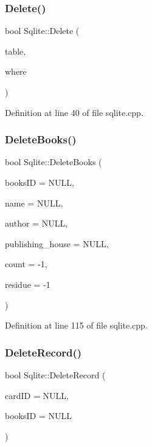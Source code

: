 \subsubsection{\texorpdfstring{Delete()}{Delete()}}
{\footnotesize\ttfamily bool Sqlite\+::\+Delete (\begin{DoxyParamCaption}\item[{Q\+String}]{table,  }\item[{Q\+String}]{where }\end{DoxyParamCaption})}



Definition at line 40 of file sqlite.\+cpp.

\mbox{\label{class_sqlite_a8a83c22e036086edf84758fb0f6cfc56}} 
\subsubsection{\texorpdfstring{DeleteBooks()}{DeleteBooks()}}
{\footnotesize\ttfamily bool Sqlite\+::\+Delete\+Books (\begin{DoxyParamCaption}\item[{Q\+String}]{books\+ID = {\ttfamily NULL},  }\item[{Q\+String}]{name = {\ttfamily NULL},  }\item[{Q\+String}]{author = {\ttfamily NULL},  }\item[{Q\+String}]{publishing\+\_\+house = {\ttfamily NULL},  }\item[{int}]{count = {\ttfamily -\/1},  }\item[{int}]{residue = {\ttfamily -\/1} }\end{DoxyParamCaption})}



Definition at line 115 of file sqlite.\+cpp.

\mbox{\label{class_sqlite_aa120de86db20f42a61a5c2eae9ad6b89}} 
\subsubsection{\texorpdfstring{DeleteRecord()}{DeleteRecord()}}
{\footnotesize\ttfamily bool Sqlite\+::\+Delete\+Record (\begin{DoxyParamCaption}\item[{Q\+String}]{card\+ID = {\ttfamily NULL},  }\item[{Q\+String}]{books\+ID = {\ttfamily NULL} }\end{DoxyParamCaption})}



